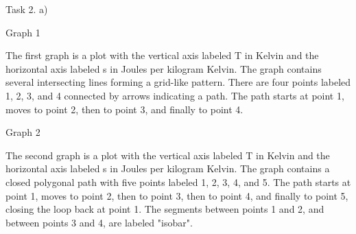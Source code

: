 Task 2. a)

Graph 1

The first graph is a plot with the vertical axis labeled T in Kelvin and the horizontal axis labeled s in Joules per kilogram Kelvin. The graph contains several intersecting lines forming a grid-like pattern. There are four points labeled 1, 2, 3, and 4 connected by arrows indicating a path. The path starts at point 1, moves to point 2, then to point 3, and finally to point 4.

Graph 2

The second graph is a plot with the vertical axis labeled T in Kelvin and the horizontal axis labeled s in Joules per kilogram Kelvin. The graph contains a closed polygonal path with five points labeled 1, 2, 3, 4, and 5. The path starts at point 1, moves to point 2, then to point 3, then to point 4, and finally to point 5, closing the loop back at point 1. The segments between points 1 and 2, and between points 3 and 4, are labeled "isobar".